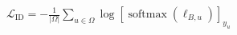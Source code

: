 \documentclass[border=3pt]{standalone}
\begin{document}
\color{ink}\fontsize{24}{32}\selectfont
$\displaystyle \mathcal L_{\mathrm{ID}}=-\frac{1}{|\Omega|}\sum_{u\in\Omega}\log\left[\operatorname{softmax}(\boldsymbol\ell_{B,u})\right]_{y_u}$
\end{document}

